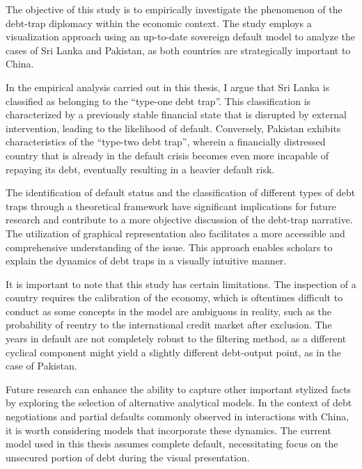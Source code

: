 The objective of this study is to empirically investigate the phenomenon of the debt-trap diplomacy within the economic context. The study employs a visualization approach using an up-to-date sovereign default model to analyze the cases of Sri Lanka and Pakistan, as both countries are strategically important to China.

In the empirical analysis carried out in this thesis, I argue that Sri Lanka is classified as belonging to the ``type-one debt trap''. This classification is characterized by a previously stable financial state that is disrupted by external intervention, leading to the likelihood of default. Conversely, Pakistan exhibits characteristics of the ``type-two debt trap'', wherein a financially distressed country that is already in the default crisis becomes even more incapable of repaying its debt, eventually resulting in a heavier default risk.

The identification of default status and the classification of different types of debt traps through a theoretical framework have significant implications for future research and contribute to a more objective discussion of the debt-trap narrative. The utilization of graphical representation also facilitates a more accessible and comprehensive understanding of the issue. This approach enables scholars to explain the dynamics of debt traps in a visually intuitive manner.

It is important to note that this study has certain limitations. The inspection of a country requires the calibration of the economy, which is oftentimes difficult to conduct as some concepts in the model are ambiguous in reality, such as the probability of reentry to the international credit market after exclusion. The years in default are not completely robust to the filtering method, as a different cyclical component might yield a slightly different debt-output point, as in the case of Pakistan.

Future research can enhance the ability to capture other important stylized facts by exploring the selection of alternative analytical models. In the context of debt negotiations and partial defaults commonly observed in interactions with China, it is worth considering models that incorporate these dynamics. The current model used in this thesis assumes complete default, necessitating focus on the unsecured portion of debt during the visual presentation.

